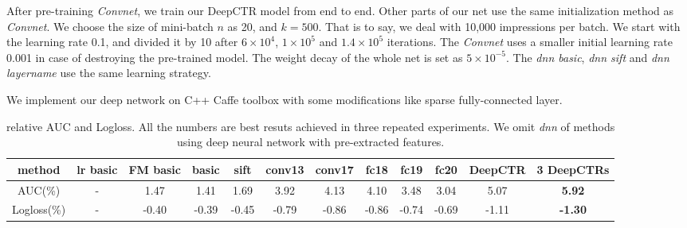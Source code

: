 \documentclass{sig-alternate-05-2015}
\begin{document}
After pre-training  \emph{Convnet}, we train our DeepCTR model from end to end. Other parts of our net use the same  initialization method as  \emph{Convnet}. We choose the size of mini-batch $n$ as 20, and $k = 500$. That is to say, we deal with 10,000 impressions per batch.  We start with the learning rate 0.1, and divided it by 10 after $6\times10^{4}$, $1\times10^{5}$ and $1.4\times10^{5}$ iterations. The \emph{Convnet} uses a smaller initial learning rate 0.001 in case of destroying the pre-trained model. The weight decay of the whole net is set as $5\times 10^{-5}$. The \emph{dnn basic}, \emph{dnn sift} and \emph{dnn layername} use the same learning strategy. 

We implement our deep network on C++ Caffe toolbox \cite{jia2014caffe} with some modifications like sparse fully-connected layer.
\begin{table}
	\centering
	\caption{relative AUC and Logloss. All the numbers are   best resuts achieved in three repeated experiments. We omit \emph{dnn} of methods using deep neural network with pre-extracted features.}
	\label{table:AUC}
	\begin{tabular}{|c|c c c c|c c c c c|c c|} \hline
		method  & lr basic &FM basic &  basic &sift &conv13 &conv17 &fc18 &fc19 &fc20 &DeepCTR &3 DeepCTRs \\  \hline
		AUC(\%) & -        &  1.47 & 1.41  &1.69 &  3.92 &4.13   &4.10 &3.48 &3.04 &5.07    &\textbf{5.92} \\  \hline
		Logloss(\%)&-      &  -0.40 & -0.39 &-0.45& -0.79 & -0.86 &-0.86&-0.74&-0.69&-1.11   & \textbf{-1.30}\\ \hline
	\end{tabular}
\end{table}
\end{document}
